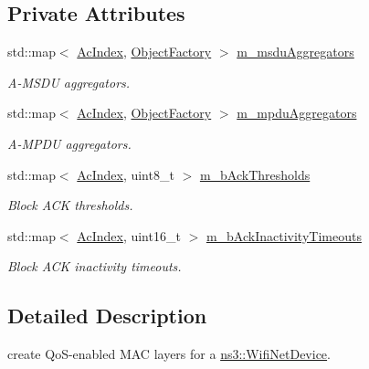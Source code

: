 \subsection*{Private Attributes}
\begin{DoxyCompactItemize}
\item 
std\+::map$<$ \hyperlink{group__wifi_gab422b4562ba272b39a9b6bca3513f3ac}{Ac\+Index}, \hyperlink{classns3_1_1ObjectFactory}{Object\+Factory} $>$ \hyperlink{classns3_1_1QosWifiMacHelper_a96ac4b7291dd02ef475a44d56ab64ab4}{m\+\_\+msdu\+Aggregators}
\begin{DoxyCompactList}\small\item\em A-\/\+M\+S\+DU aggregators. \end{DoxyCompactList}\item 
std\+::map$<$ \hyperlink{group__wifi_gab422b4562ba272b39a9b6bca3513f3ac}{Ac\+Index}, \hyperlink{classns3_1_1ObjectFactory}{Object\+Factory} $>$ \hyperlink{classns3_1_1QosWifiMacHelper_a489cb3650492ad98b37ba54e87f97c15}{m\+\_\+mpdu\+Aggregators}
\begin{DoxyCompactList}\small\item\em A-\/\+M\+P\+DU aggregators. \end{DoxyCompactList}\item 
std\+::map$<$ \hyperlink{group__wifi_gab422b4562ba272b39a9b6bca3513f3ac}{Ac\+Index}, uint8\+\_\+t $>$ \hyperlink{classns3_1_1QosWifiMacHelper_a0725f0e95f9655273bb9c4e3b862dd27}{m\+\_\+b\+Ack\+Thresholds}
\begin{DoxyCompactList}\small\item\em Block A\+CK thresholds. \end{DoxyCompactList}\item 
std\+::map$<$ \hyperlink{group__wifi_gab422b4562ba272b39a9b6bca3513f3ac}{Ac\+Index}, uint16\+\_\+t $>$ \hyperlink{classns3_1_1QosWifiMacHelper_a532f48518af420308c6b2b81308e92e4}{m\+\_\+b\+Ack\+Inactivity\+Timeouts}
\begin{DoxyCompactList}\small\item\em Block A\+CK inactivity timeouts. \end{DoxyCompactList}\end{DoxyCompactItemize}


\subsection{Detailed Description}
create Qo\+S-\/enabled M\+AC layers for a \hyperlink{classns3_1_1WifiNetDevice}{ns3\+::\+Wifi\+Net\+Device}. 


